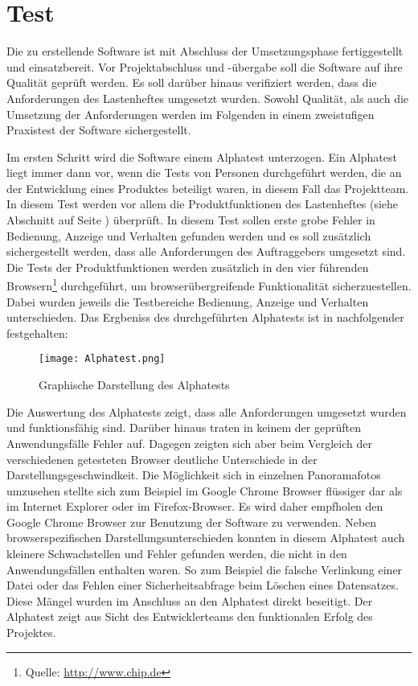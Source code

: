 \section{Test}
\label{sec:Test}

Die zu erstellende Software ist mit Abschluss der Umsetzungsphase fertiggestellt und einsatzbereit. Vor Projektabschluss und -übergabe soll die Software auf ihre Qualität geprüft werden. Es soll darüber hinaus verifiziert werden, dass die Anforderungen des Lastenheftes umgesetzt wurden. Sowohl Qualität, als auch die Umsetzung der Anforderungen werden im Folgenden in einem zweistufigen Praxistest der Software sichergestellt.

Im ersten Schritt wird die Software einem Alphatest unterzogen. Ein Alphatest liegt immer dann vor, wenn die Tests von Personen durchgeführt werden, die an der Entwicklung eines Produktes beteiligt waren, in diesem Fall das Projektteam. In diesem Test werden vor allem die Produktfunktionen des Lastenheftes (siehe Abschnitt  auf Seite \pageref{sec:Lastenheft}) überprüft. In diesem Test sollen erste grobe Fehler in Bedienung, Anzeige und Verhalten gefunden werden und es soll zusätzlich sichergestellt werden, dass alle Anforderungen des Auftraggebers umgesetzt sind. Die Tests der Produktfunktionen werden zusätzlich in den vier führenden Browsern\footnote{Quelle: \url{http://www.chip.de}} durchgeführt, um browserübergreifende Funktionalität sicherzuestellen.
Dabei wurden jeweils die Testbereiche Bedienung, Anzeige und Verhalten unterschieden. Das Ergbeniss des durchgeführten Alphatests ist in nachfolgender  festgehalten:

\begin{figure}[htb]
\centering
\texttt{[image: Alphatest.png]}
\caption[Mockup Backend]{Graphische Darstellung des Alphatests\protect\footnotemark}
\label{fig:Alphatest}
\end{figure}

Die Auswertung des Alphatests zeigt, dass alle Anforderungen umgesetzt wurden und funktionsfähig sind. Darüber hinaus
traten in keinem der geprüften Anwendungsfälle Fehler auf.
Dagegen zeigten sich aber beim Vergleich der verschiedenen getesteten Browser deutliche Unterschiede in der
Darstellungsgeschwindkeit.
Die Möglichkeit sich in einzelnen Panoramafotos umzusehen stellte sich zum Beispiel im Google Chrome Browser
flüssiger dar als im Internet Explorer oder im Firefox-Browser. Es wird daher empfholen den Google Chrome Browser
zur Benutzung der Software zu verwenden.
Neben browserspezifischen Darstellungsunterschieden konnten in diesem Alphatest auch kleinere Schwachstellen und Fehler gefunden werden, die nicht in den Anwendungsfällen enthalten waren. So zum Beispiel die falsche Verlinkung einer Datei oder das Fehlen einer Sicherheitsabfrage beim Löschen eines Datensatzes. Diese Mängel wurden im Anschluss an den Alphatest direkt beseitigt.
Der Alphatest zeigt aus Sicht des Entwicklerteams den funktionalen Erfolg des Projektes.

